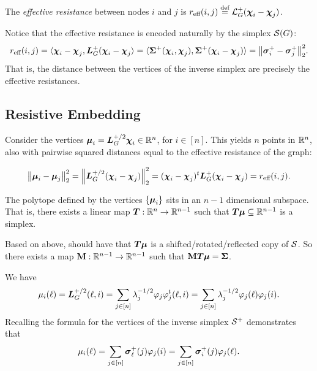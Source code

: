 \begin{definition}
The \emph{effective resistance} between nodes $i$ and $j$ is $r_{\text{eff}}(i,j) \overset{\text{def}}{=} \mathcal{L}_G^+(\boldsymbol{\chi}_i-\boldsymbol{\chi}_j)$.  
\end{definition}

Notice that the effective resistance is encoded naturally by the simplex $\mathcal{S}(G)$: 
\[r_{\text{eff}}(i,j) = \langle \boldsymbol{\chi}_i-\boldsymbol{\chi}_j,\vb*{L}_G^+(\boldsymbol{\chi}_i-\boldsymbol{\chi}_j\rangle = \langle \boldsymbol{\Sigma}^+(\boldsymbol{\chi}_i,\boldsymbol{\chi}_j),\boldsymbol{\Sigma}^+(\boldsymbol{\chi}_i-\boldsymbol{\chi}_j)\rangle = \norm{\vb*{\sigma}_i^+-\vb*{\sigma}_j^+}_2^2.\]
That is, the distance between the vertices of the inverse simplex are precisely the effective resistances. 

\subsection{Resistive Embedding}

Consider the vertices $\vb*{\mu}_i=\vb*{L}_G^{+/2}\boldsymbol{\chi}_i\in\mathbb{R}^n$, for $i\in[n]$. This yields $n$ points in $\mathbb{R}^n$, also with pairwise squared distances equal to the effective resistance of the graph: 

\begin{equation*}
    \norm{\vb*{\mu}_i-\vb*{\mu}_j}_2^2 = \norm{\vb*{L}_G^{+/2}(\boldsymbol{\chi}_i-\boldsymbol{\chi}_j)}_2^2 =  (\boldsymbol{\chi}_i-\boldsymbol{\chi}_j)^t \vb*{L}_G^+(\boldsymbol{\chi}_i-\boldsymbol{\chi}_j)=r_{\text{eff}}(i,j).
\end{equation*}

\begin{claim}
 The polytope defined by the vertices $\{\vb*{\mu}_i\}$ sits in an $n-1$ dimensional subspace. That  is, there exists a linear map $\vb*{T}:\mathbb{R}^n\to\mathbb{R}^{n-1}$ such that $\vb*{T}\vb*{\mu}\subseteq\mathbb{R}^{n-1}$ is a simplex.
\end{claim}

Based on above, should have  that $\vb*{T}\vb*{\mu}$ is a shifted/rotated/reflected copy of $\mathcal{S}$. So there exists a map $\vb{M}:\mathbb{R}^{n-1}\to\mathbb{R}^{n-1}$ such that $\vb{M}\vb*{T}\vb*{\mu}=\boldsymbol{\Sigma}$. 

We have 
\begin{align*}
    \mu_i(\ell) = \vb*{L}_G^{+/2}(\ell,i) = \sum_{j\in[n]}\lambda_j^{-1/2}\varphi_j\varphi_j^t(\ell,i) = \sum_{j\in[n]}\lambda_j^{-1/2}\varphi_j(\ell)\varphi_j(i).
\end{align*}
Recalling the formula for the vertices of the inverse simplex $\mathcal{S}^+$ demonstrates that 
\begin{equation*}
    \mu_i(\ell) = \sum_{j\in[n]}\vb*{\sigma}_\ell^+(j)\varphi_j(i) = \sum_{j\in[n]}\vb*{\sigma}_i^+(j)\varphi_j(\ell).
\end{equation*}

